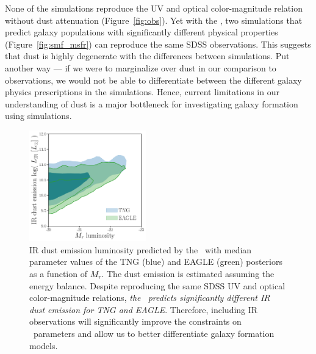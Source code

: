 

None of the simulations reproduce the UV and optical color-magnitude relation
without dust attenuation (Figure~\ref{fig:obs}). 
Yet with the \eda, two simulations that predict galaxy populations with
significantly different physical properties (Figure~\ref{fig:smf_msfr}) can
reproduce the same SDSS observations. 
This suggests that dust is highly degenerate with the differences between simulations. 
Put another way --- if we were to marginalize over dust in our comparison to observations, we would not
be able to differentiate between the different galaxy physics prescriptions in
the simulations. 
Hence, current limitations in our understanding of dust is 
a major bottleneck for investigating galaxy formation using simulations.


\begin{figure}
\begin{center}
    \includegraphics[width=0.45\textwidth]{figs/abc_Lir.pdf}
    \caption{\label{fig:lir}
    IR dust emission luminosity predicted by the \eda~with median parameter
    values of the TNG (blue) and EAGLE (green) posteriors as a function of
    $M_r$. The dust emission is estimated assuming the \cite{dacunha2008}
    energy balance.  Despite reproducing the same SDSS UV and optical
    color-magnitude relations, \emph{the \eda~predicts significantly different
    IR dust emission for TNG and EAGLE}. Therefore, including IR
    observations will significantly improve the constraints on \eda~parameters
    and allow us to better differentiate galaxy formation models.
    }
\end{center}
\end{figure}

